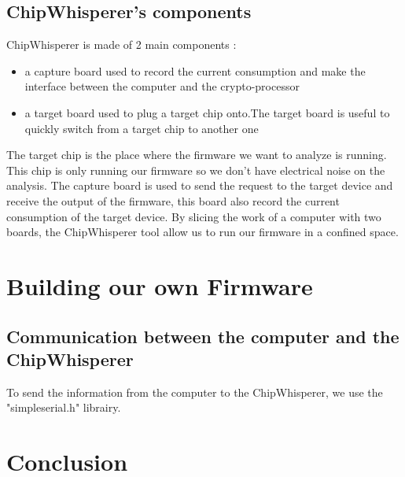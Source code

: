 \documentclass[a4paper,12pt]{article}
\begin{document}
\subsection{ChipWhisperer's components }

\noindent ChipWhisperer is made of 2 main components :
\begin{itemize}
\item{a capture board used to record the current consumption and make the interface between the computer and the crypto-processor}
\item{a target board used to plug a target chip onto.The target board is useful to quickly switch from a target chip to another one} 
\end{itemize}

The target chip is the place where the firmware we want to analyze is running. This chip is only running our firmware so we don't have electrical noise on the analysis. The capture board is used to send the request to the target device and receive the output of the firmware, this board also record the current consumption of the target device. By slicing the work of a computer with two boards, the ChipWhisperer tool allow us to run our firmware in a confined space.

\section{Building our own Firmware}
\subsection{Communication between the computer and the ChipWhisperer}
To send the information from the computer to the ChipWhisperer, we use the "simpleserial.h" librairy.


\section{Conclusion}
\end{document}
